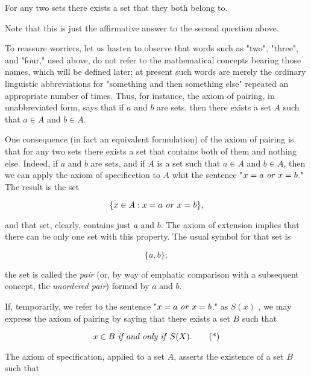 \begin{named}  For any two sets there exists a set that they both belong to.
\end{named}


Note that this is just the affirmative answer to the second question above.

To reassure worriers, let us hasten to observe that words such as "two", "three", and "four," used above, do not refer to the mathematical concepts bearing those names, which will be defined later; at present such words are merely the ordinary linguistic abbreviations for "something and then something else" repeated an appropriate number of times. Thus, for instance, the axiom of pairing, in unabbreviated form, says that if $a$ and $b$ are sets, then there exists a set $A$ such that $a \in A$ and $b \in A$.

One consequence (in fact an equivalent formulation) of the axiom of pairing is that for any two sets there exists a set that contains both of them and nothing else. Indeed, if $a$ and $b$ are sets, and if $A$ is a set such that $a \in A$ and $b \in A$, then we can apply the axiom of specificetion to $A$ whit the sentence "$x = a \text{ \textit{or} } x = b$." The result is the set 

\begin{equation*}
\{ x \in A: x = a \text{ \textit{or} } x = b \},
\end{equation*}

and that set, clearly, contains just $a$ and $b$. The axiom of extension implies that there can be only one set with this property. The usual symbol for that set is

\begin{equation*}
\{ a, b \};
\end{equation*}

the set is called the \textit{pair} (or, by way of emphatic comparison with a subsequent concept, the \textit{unordered pair}) formed by $a$ and $b$. 

If, temporarily, we refer to the sentence "$x = a \text{ \textit{or} } x = b$." as $S(x)$ , we may express the axiom of pairing by saying that there exists a set $B$ such that 

\begin{equation}\label{nothing}
x \in B \text{ \textit{if and only if} } S(X). \tag{*}
\end{equation}

The axiom of specification, applied to a set $A$, asserts the existence of a set $B$ such that 

